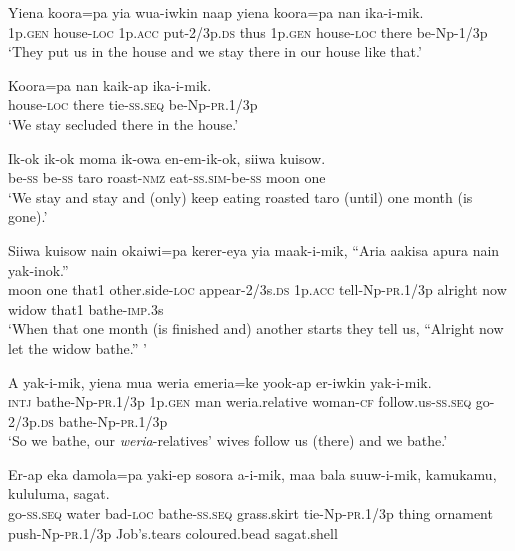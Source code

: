 \ea
\gll  Yiena  koora=pa  yia  wua-iwkin  naap  yiena  koora=pa      nan  ika-i-mik. \\
1p.\textsc{gen}  house-\textsc{loc}  1p.\textsc{acc}  put-2/3p.\textsc{ds}  thus  1p.\textsc{gen}  house-\textsc{loc}   there  be-Np-1/3p \\


\glt ‘They put us in the house and we stay there in our house like that.’ \\
\z


\ea
\gll  Koora=pa  nan  kaik-ap  ika-i-mik. \\
house-\textsc{loc}  there  tie-\textsc{ss.seq}  be-Np-\textsc{pr}.1/3p \\
\glt ‘We stay secluded there in the house.’ \\
\z


\ea
\gll  Ik-ok  ik-ok  moma  ik-owa  en-em-ik-ok,  siiwa  kuisow. \\
be-\textsc{ss}  be-\textsc{ss}  taro  roast-\textsc{nmz}  eat-\textsc{ss}.\textsc{sim}-be-\textsc{ss}  moon  one \\
\glt ‘We stay and stay and (only) keep eating roasted taro (until) one month (is gone).’ \\
\z


\ea
\gll  Siiwa  kuisow  nain  okaiwi=pa  kerer-eya  yia  maak-i-mik,           “Aria  aakisa  apura  nain  yak-inok.” \\
moon  one  that1  other.side-\textsc{loc}  appear-2/3s.\textsc{ds}  1p.\textsc{acc}  tell-Np-\textsc{pr}.1/3p   alright  now  widow  that1  bathe-\textsc{imp}.3s \\


\glt ‘When that one month (is finished and) another starts they tell us, “Alright now let the widow bathe.” ’ \\
\z


\ea
\gll  A  yak-i-mik,  yiena  mua  weria  emeria=ke             yook-ap  er-iwkin  yak-i-mik. \\
\textsc{intj}  bathe-Np-\textsc{pr}.1/3p  1p.\textsc{gen}  man  weria.relative  woman-\textsc{cf} follow.us-\textsc{ss.seq}  go-2/3p.\textsc{ds}  bathe-Np-\textsc{pr}.1/3p \\


\glt ‘So we bathe, our \textit{weria}{}-relatives’ wives follow us (there) and we bathe.’ \\
\z


\ea
\gll  Er-ap  eka  damola=pa  yaki-ep  sosora  a-i-mik,                maa  bala  suuw-i-mik,  kamukamu,  kululuma,  sagat. \\
go-\textsc{ss.seq}  water  bad-\textsc{loc}  bathe-\textsc{ss.seq}  grass.skirt  tie-Np-\textsc{pr}.1/3p  thing  ornament  push-Np-\textsc{pr}.1/3p  Job’s.tears  coloured.bead  sagat.shell \\


